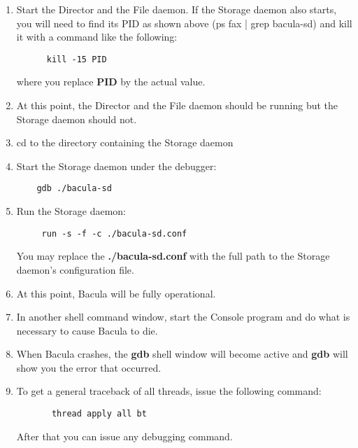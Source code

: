 \begin{enumerate}
\item Start the Director and the File daemon. If the  Storage daemon also
   starts, you will need to find its PID  as shown above (ps fax | grep
   bacula-sd) and kill it  with a command like the following:

\footnotesize
\begin{verbatim}
      kill -15 PID
\end{verbatim}
\normalsize

where you replace {\bf PID} by the actual value.

\item At this point, the Director and the File daemon should  be running but
   the Storage daemon should not.

\item cd to the directory containing the Storage daemon

\item Start the Storage daemon under the debugger:

   \footnotesize
\begin{verbatim}
    gdb ./bacula-sd
\end{verbatim}
\normalsize

\item Run the Storage daemon:

   \footnotesize
\begin{verbatim}
     run -s -f -c ./bacula-sd.conf
\end{verbatim}
\normalsize

You may replace the {\bf ./bacula-sd.conf} with the full path  to the Storage
daemon's configuration file.

\item At this point, Bacula will be fully operational.

\item In another shell command window, start the Console program  and do what
   is necessary to cause Bacula to die.

\item When Bacula crashes, the {\bf gdb} shell window will  become active and
   {\bf gdb} will show you the error that  occurred.

\item To get a general traceback of all threads, issue the following  command:


\footnotesize
\begin{verbatim}
       thread apply all bt
\end{verbatim}
\normalsize

After that you can issue any debugging command.
\end{enumerate}

